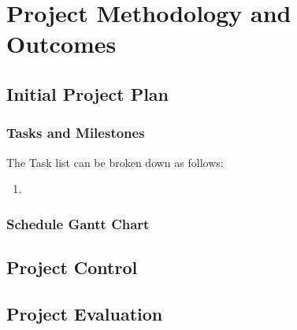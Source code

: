 \documentclass[11pt, a4paper, notitlepage]{report}
\begin{document}
\chapter{Project Methodology and Outcomes}
\section{Initial Project Plan}
\subsection{Tasks and Milestones}
The Task list can be broken down as follows:
\begin{enumerate}
	\item 
\end{enumerate}

\subsection{Schedule Gantt Chart}\label{subsec:schedGanttCt}
\section{Project Control}
\section{Project Evaluation}

\appendix
\end{document}
